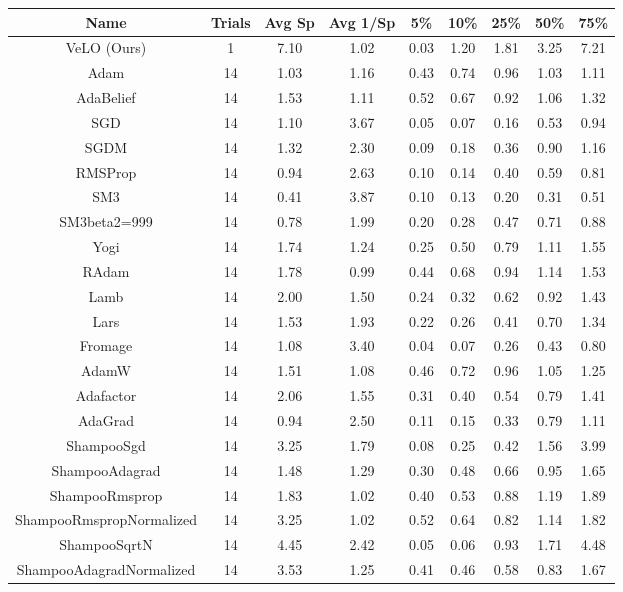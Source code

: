 \footnotesize
\begin{tabular}{||c c c c c c c c c||} 
     \hline
     Name & Trials & Avg Sp & Avg 1/Sp & 5\% & 10\% & 25\% & 50\% & 75\%  \\ [0.5ex] 
     \hline\hline

VeLO (Ours) & 1 &7.10 & 1.02 & 0.03 & 1.20 & 1.81 & 3.25 & 7.21 \\
\hline
Adam & 14 &1.03 & 1.16 & 0.43 & 0.74 & 0.96 & 1.03 & 1.11 \\
AdaBelief & 14 &1.53 & 1.11 & 0.52 & 0.67 & 0.92 & 1.06 & 1.32 \\
SGD & 14 &1.10 & 3.67 & 0.05 & 0.07 & 0.16 & 0.53 & 0.94 \\
SGDM & 14 &1.32 & 2.30 & 0.09 & 0.18 & 0.36 & 0.90 & 1.16 \\
RMSProp & 14 &0.94 & 2.63 & 0.10 & 0.14 & 0.40 & 0.59 & 0.81 \\
SM3 & 14 &0.41 & 3.87 & 0.10 & 0.13 & 0.20 & 0.31 & 0.51 \\
SM3beta2=999 & 14 &0.78 & 1.99 & 0.20 & 0.28 & 0.47 & 0.71 & 0.88 \\
Yogi & 14 &1.74 & 1.24 & 0.25 & 0.50 & 0.79 & 1.11 & 1.55 \\
RAdam & 14 &1.78 & 0.99 & 0.44 & 0.68 & 0.94 & 1.14 & 1.53 \\
Lamb & 14 &2.00 & 1.50 & 0.24 & 0.32 & 0.62 & 0.92 & 1.43 \\
Lars & 14 &1.53 & 1.93 & 0.22 & 0.26 & 0.41 & 0.70 & 1.34 \\
Fromage & 14 &1.08 & 3.40 & 0.04 & 0.07 & 0.26 & 0.43 & 0.80 \\
AdamW & 14 &1.51 & 1.08 & 0.46 & 0.72 & 0.96 & 1.05 & 1.25 \\
Adafactor & 14 &2.06 & 1.55 & 0.31 & 0.40 & 0.54 & 0.79 & 1.41 \\
AdaGrad & 14 &0.94 & 2.50 & 0.11 & 0.15 & 0.33 & 0.79 & 1.11 \\
ShampooSgd & 14 &3.25 & 1.79 & 0.08 & 0.25 & 0.42 & 1.56 & 3.99 \\
ShampooAdagrad & 14 &1.48 & 1.29 & 0.30 & 0.48 & 0.66 & 0.95 & 1.65 \\
ShampooRmsprop & 14 &1.83 & 1.02 & 0.40 & 0.53 & 0.88 & 1.19 & 1.89 \\
ShampooRmspropNormalized & 14 &3.25 & 1.02 & 0.52 & 0.64 & 0.82 & 1.14 & 1.82 \\
ShampooSqrtN & 14 &4.45 & 2.42 & 0.05 & 0.06 & 0.93 & 1.71 & 4.48 \\
ShampooAdagradNormalized & 14 &3.53 & 1.25 & 0.41 & 0.46 & 0.58 & 0.83 & 1.67 \\

\end{tabular}
